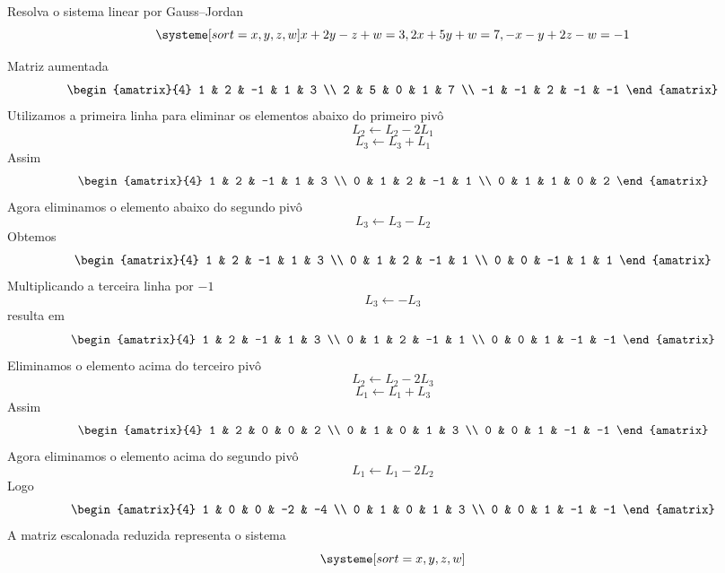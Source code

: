 \documentclass[a4paper,12pt,fleqn]{article}
\begin{document}
Resolva o sistema linear por Gauss--Jordan
\[
  \systeme[sort={x, y, z, w}]{
     x + 2y -  z + w = 3,
    2x + 5y +      w = 7,
    -x -  y + 2z - w = -1
  }
\]

\begin{answer}
Matriz aumentada
\[
\begin{amatrix}{4}
  1  & 2  & -1 & 1  & 3  \\
  2  & 5  & 0  & 1  & 7  \\
  -1 & -1 & 2  & -1 & -1
\end{amatrix}
\]
Utilizamos a primeira linha para eliminar os elementos abaixo
do primeiro pivô
\[
  L_2\leftarrow L_2-2L_1
\]
\[
  L_3\leftarrow L_3+L_1
\]
Assim
\[
\begin{amatrix}{4}
  1 & 2 & -1 & 1  & 3 \\
  0 & 1 & 2  & -1 & 1 \\
  0 & 1 & 1  & 0  & 2
\end{amatrix}
\]
Agora eliminamos o elemento abaixo do segundo pivô
\[
  L_3 \leftarrow L_3 - L_2
\]
Obtemos
\[
\begin{amatrix}{4}
  1 & 2 & -1 & 1  & 3 \\
  0 & 1 & 2  & -1 & 1 \\
  0 & 0 & -1 & 1  & 1
\end{amatrix}
\]
Multiplicando a terceira linha por $-1$
\[
  L_3 \leftarrow - L_3
\]
resulta em
\[
\begin{amatrix}{4}
  1 & 2 & -1 & 1  & 3  \\
  0 & 1 & 2  & -1 & 1  \\
  0 & 0 & 1  & -1 & -1
\end{amatrix}
\]
Eliminamos o elemento acima do terceiro pivô
\[
  L_2 \leftarrow L_2 - 2 L_3
\]
\[
  L_1 \leftarrow L_1 + L_3
\]
Assim
\[
\begin{amatrix}{4}
  1 & 2 & 0 & 0  & 2  \\
  0 & 1 & 0 & 1  & 3  \\
  0 & 0 & 1 & -1 & -1
\end{amatrix}
\]
Agora eliminamos o elemento acima do segundo pivô
\[
  L_1\leftarrow L_1 - 2 L_2
\]
Logo
\[
\begin{amatrix}{4}
  1 & 0 & 0 & -2 & -4 \\
  0 & 1 & 0 & 1  & 3  \\
  0 & 0 & 1 & -1 & -1
\end{amatrix}
\]
A matriz escalonada reduzida representa o sistema
\[
  \systeme[sort={x, y, z, w}]{
}\]
\end{answer}
\end{document}
